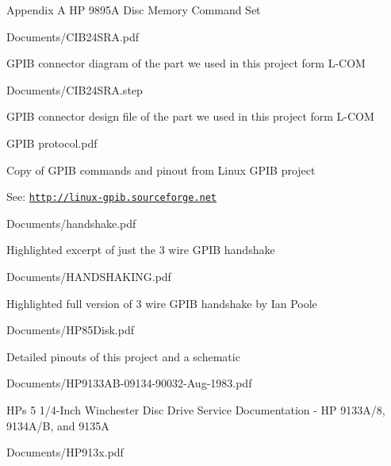 {\begin{DoxyItemize}
\begin{DoxyItemize}
\item Appendix A HP 9895A Disc Memory Command Set
\end{DoxyItemize}
\item Documents/\+C\+I\+B24\+S\+R\+A.\+pdf
\begin{DoxyItemize}
\item G\+P\+IB connector diagram of the part we used in this project form L-\/\+C\+OM
\end{DoxyItemize}
\item Documents/\+C\+I\+B24\+S\+R\+A.\+step
\begin{DoxyItemize}
\item G\+P\+IB connector design file of the part we used in this project form L-\/\+C\+OM
\end{DoxyItemize}
\item G\+P\+IB protocol.\+pdf
\begin{DoxyItemize}
\item Copy of G\+P\+IB commands and pinout from Linux G\+P\+IB project
\item See\+: \href{http://linux-gpib.sourceforge.net}{\tt http\+://linux-\/gpib.\+sourceforge.\+net}
\end{DoxyItemize}
\item Documents/handshake.\+pdf
\begin{DoxyItemize}
\item Highlighted excerpt of just the 3 wire G\+P\+IB handshake
\end{DoxyItemize}
\item Documents/\+H\+A\+N\+D\+S\+H\+A\+K\+I\+N\+G.\+pdf
\begin{DoxyItemize}
\item Highlighted full version of 3 wire G\+P\+IB handshake by Ian Poole
\end{DoxyItemize}
\item Documents/\+H\+P85\+Disk.\+pdf
\begin{DoxyItemize}
\item Detailed pinouts of this project and a schematic
\end{DoxyItemize}
\item Documents/\+H\+P9133\+A\+B-\/09134-\/90032-\/\+Aug-\/1983.\+pdf
\begin{DoxyItemize}
\item H\+Ps 5 1/4-\/\+Inch Winchester Disc Drive Service Documentation -\/ HP 9133\+A/8, 9134\+A/B, and 9135A
\end{DoxyItemize}
\item Documents/\+H\+P913x.\+pdf

\end{DoxyItemize}}
